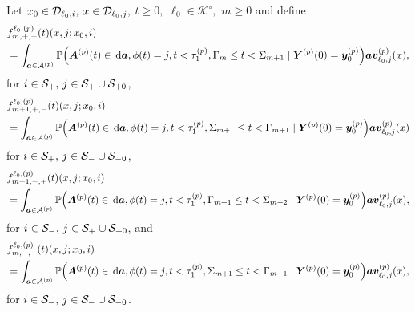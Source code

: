 Let \(x_0\in\mathcal{D}_{\ell_0,i},\) \(x\in\mathcal{D}_{\ell_0,j},\) \(t\geq0,\) \(\ell_0\in\mathcal K^\circ,\) \(m\geq 0\) and define
\begin{align}
	&f^{\ell_0,(p)}_{m,+,+}(t)( x,j; x_0,i)  \nonumber
	\\&=\int_{\boldsymbol a \in\mathcal A^{(p)}}\mathbb P\Big(\boldsymbol A^{(p)}(t)\in \, \mathrm{d} \boldsymbol a, \phi(t) = j, t<\tau_1^{(p)}, \Gamma_m\leq t<\Sigma_{m+1} \nonumber
	\mid \boldsymbol Y^{(p)}(0)=\boldsymbol y_0^{(p)}\Big)
	\boldsymbol a{\boldsymbol v}_{\ell_0,j}^{(p)}(x), \nonumber
\end{align}
for \(i\in\mathcal{S}_+,\,j\in\mathcal S_+\cup\mathcal S_{+0}\),
\begin{align}
	&f^{\ell_0,(p)}_{m+1,+,-}(t)(  x, j; x_0,i) \nonumber
	\\&= \int_{\boldsymbol a \in\mathcal A^{(p)}}\mathbb P\Big(\boldsymbol A^{(p)}(t)\in \, \mathrm{d} \boldsymbol a, \phi(t) = j, t<\tau_1^{(p)}, \Sigma_{m+1}\leq t<\Gamma_{m+1}\mid 
	\boldsymbol Y^{(p)}(0)=\boldsymbol y_0^{(p)}\Big)
	\boldsymbol a{\boldsymbol v}_{\ell_0,j}^{(p)}( x)  \nonumber 
\end{align}
for \(i\in\mathcal{S}_+,\,j\in\mathcal S_-\cup\mathcal S_{-0}\),
\begin{align}
	&f^{\ell_0,(p)}_{m+1,-,+}(t)( x, j; x_0,i) \nonumber
	\\&= \int_{\boldsymbol a \in\mathcal A^{(p)}}\mathbb P\Big(\boldsymbol A^{(p)}(t)\in \, \mathrm{d} \boldsymbol a, \phi(t) = j, t<\tau_1^{(p)},  \Gamma_{m+1}\leq t<\Sigma_{m+2} \mid 
	\boldsymbol Y^{(p)}(0)=\boldsymbol y_0^{(p)}\Big)\nonumber
	  \boldsymbol a{\boldsymbol v}_{\ell_0,j}^{(p)}(x),
\end{align}
for \(i\in\mathcal{S}_-,\,j\in\mathcal S_+\cup\mathcal S_{+0}\), and 
\begin{align}
	&f^{\ell_0,(p)}_{m,-,-}(t)( x, j; x_0, i) \nonumber
	\\&= \int_{\boldsymbol a \in\mathcal A^{(p)}}\mathbb P\Big(\boldsymbol A^{(p)}(t)\in \, \mathrm{d} \boldsymbol a, \phi(t) = j,  t<\tau_1^{(p)}, \Sigma_{m+1}\leq t<\Gamma_{m+1} \mid \boldsymbol Y^{(p)}(0)=\boldsymbol y_0^{(p)} \Big)\boldsymbol a{\boldsymbol v}_{\ell_0,j}^{(p)}(x) \nonumber,
\end{align}
for \(i\in\mathcal{S}_-,\,j\in\mathcal S_-\cup\mathcal S_{-0}\). %

